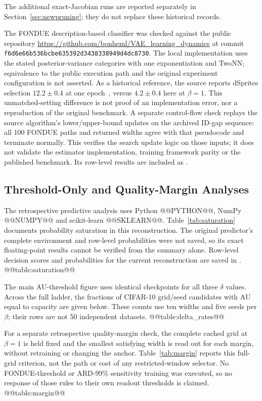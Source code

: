 The additional exact-Jacobian runs are reported separately in
Section~\ref{sec:newpruning}; they do not replace these historical records.

The FONDUE description-based classifier was checked against the public
repository \url{https://github.com/bonheml/VAE_learning_dynamics} at
commit \texttt{f6d6e66b536bcbe635392d3438338949d4dc8730}. The local
implementation uses the stated posterior-variance categories with one
exponentiation and TwoNN; equivalence to the public execution path and
the original experiment configuration is not asserted. As a historical
reference, the source reports dSprites selection $12.2\pm0.4$ at one
epoch~\cite{bonheme2022fondue}, versus $4.2\pm0.4$ here at $\beta=1$.
This unmatched-setting difference is not proof of an implementation
error, nor a reproduction of the original benchmark.
A separate control-flow check replays the source algorithm's
lower/upper-bound updates on the archived ID-gap sequence: all 100
FONDUE paths and returned widths agree with that pseudocode and
terminate normally. This verifies the search update logic on those
inputs; it does not validate the estimator implementation, training
framework parity or the published benchmark. Its row-level results
are included as .

\subsection{Threshold-Only and Quality-Margin Analyses}\label{app:sensitivity}
The retrospective predictive analysis uses Python @@PYTHON@@,
NumPy @@NUMPY@@ and scikit-learn @@SKLEARN@@. Table~\ref{tab:saturation}
documents probability saturation in this reconstruction. The original
predictor's complete environment and row-level probabilities were not
saved, so its exact floating-point results cannot be verified from the
summary alone. Row-level decision scores and probabilities for the
current reconstruction are saved in .
@@table:saturation@@

The main AU-threshold figure uses identical checkpoints for all three
$\delta$ values. Across the full ladder, the fractions of CIFAR-10
grid/seed candidates with AU equal to capacity are given below.
These counts use ten widths and five seeds per $\beta$; their rows are
not 50 independent datasets.
@@table:delta_rates@@

For a separate retrospective quality-margin check, the complete cached
grid at $\beta=1$ is held fixed and the smallest satisfying width is read
out for each margin, without retraining or changing the anchor.
Table~\ref{tab:margin} reports this full-grid criterion, not the path or
cost of any restricted-window selector. No FONDUE-threshold or ARD-99\%
sensitivity training was executed, so no response of those rules to their
own readout thresholds is claimed.
@@table:margin@@

